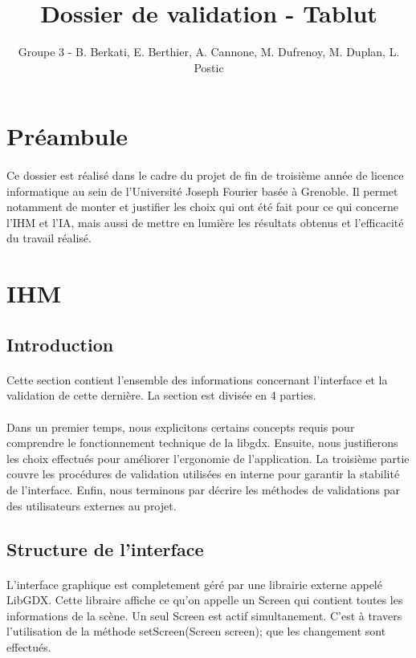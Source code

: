 \documentclass[11pt]{article} %
\title{Dossier de validation - Tablut}
\author{Groupe 3 - B. Berkati, E. Berthier, A. Cannone, M. Dufrenoy, M. Duplan, L. Postic}
\begin{document}
\maketitle

\section{Préambule}
\paragraph{}
Ce dossier est réalisé dans le cadre du projet de fin de troisième année de licence informatique au sein de l'Université Joseph Fourier basée à Grenoble. Il permet notamment de monter et justifier les choix qui ont été fait pour ce qui concerne l'IHM et l'IA, mais aussi de mettre en lumière les résultats obtenus et l'efficacité du travail réalisé.

\section{IHM}

\subsection{Introduction}
\paragraph{}
Cette section contient l'ensemble des informations concernant l'interface et la validation de cette dernière. La section est divisée en 4 parties.
\paragraph{}
Dans un premier temps, nous explicitons certains concepts requis pour comprendre le fonctionnement technique de la libgdx. Ensuite, nous justifierons les choix effectués pour améliorer l'ergonomie de l'application. La troisième partie couvre les procédures de validation utilisées en interne pour garantir la stabilité de l'interface. Enfin, nous terminons par décrire les méthodes de validations par des utilisateurs externes au projet.


\subsection{Structure de l'interface}
\paragraph{}
L'interface graphique est completement géré par une librairie externe appelé LibGDX. Cette libraire affiche ce qu'on appelle un Screen qui contient toutes les informations de la scène. Un seul Screen est actif simultanement. C'est à travers l'utilisation de la méthode setScreen(Screen screen); que les changement sont effectués.
\end{document}

